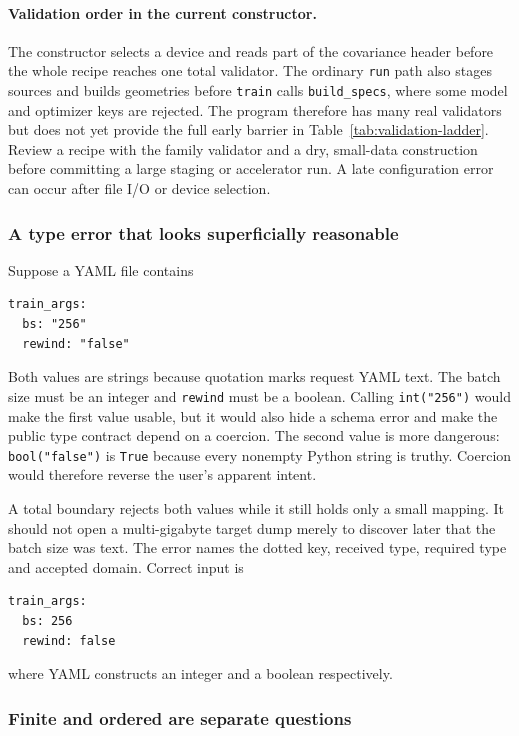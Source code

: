 \documentclass[10pt,aps,prd,twocolumn,nofootinbib]{revtex4-2}
\newcommand{\code}[1]{\texttt{#1}}
\begin{document}
\paragraph{Validation order in the current constructor.}
The constructor selects a device and reads part of the covariance header before
the whole recipe reaches one total validator.  The ordinary \code{run} path
also stages sources and builds geometries before \code{train} calls
\code{build\_specs}, where some model and optimizer keys are rejected.  The
program therefore has many real validators but does not yet provide the full
early barrier in Table~\ref{tab:validation-ladder}.  Review a recipe with the
family validator and a dry, small-data construction before committing a large
staging or accelerator run.  A late configuration error can occur after file
I/O or device selection.

\subsubsection{A type error that looks superficially reasonable}

Suppose a YAML file contains
\begin{verbatim}
train_args:
  bs: "256"
  rewind: "false"
\end{verbatim}
Both values are strings because quotation marks request YAML text.  The batch
size must be an integer and \code{rewind} must be a boolean.  Calling
\code{int("256")} would make the first value usable, but it would also hide a
schema error and make the public type contract depend on a coercion.  The
second value is more dangerous: \code{bool("false")} is \code{True} because
every nonempty Python string is truthy.  Coercion would therefore reverse the
user's apparent intent.

A total boundary rejects both values while it still holds only a small
mapping.  It should not open a multi-gigabyte target dump merely to discover
later that the batch size was text.  The error names the dotted key, received
type, required type and accepted domain.  Correct input is
\begin{verbatim}
train_args:
  bs: 256
  rewind: false
\end{verbatim}
where YAML constructs an integer and a boolean respectively.

\subsubsection{Finite and ordered are separate questions}
\end{document}
